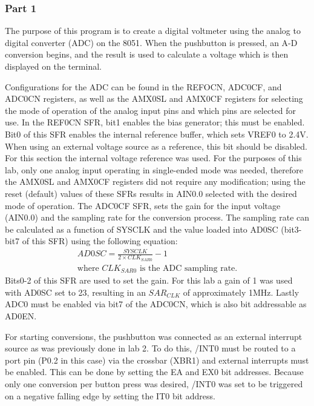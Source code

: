 \documentclass[12pt]{article}
\begin{document}
\subsubsection{Part 1}

The purpose of this program is to create a digital voltmeter using the analog to digital converter (ADC) on the 8051. When the pushbutton is pressed, an A-D conversion begins, and the result is used to calculate a voltage which is then displayed on the terminal. 

Configurations for the ADC can be found in the REFOCN, ADC0CF, and ADC0CN registers, as well as the AMX0SL and AMX0CF registers for selecting the mode of operation of the analog input pins and which pins are selected for use. In the REF0CN SFR, bit1 enables the bias generator; this must be enabled. Bit0 of this SFR enables the internal reference buffer, which sets VREF0 to 2.4V. When using an external voltage source as a reference, this bit should be disabled. For this section the internal voltage reference was used. For the purposes of this lab, only one analog input operating in single-ended mode was needed, therefore the AMX0SL and AMX0CF registers did not require any modification; using the reset (default) values of these SFRs results in AIN0.0 selected with the desired mode of operation. The ADC0CF SFR, sets the gain for the input voltage (AIN0.0) and the sampling rate for the conversion process. The sampling rate can be calculated as a function of SYSCLK and the value loaded into AD0SC (bit3-bit7 of this SFR) using the following equation:
\begin{gather*}
AD0SC = \frac{SYSCLK}{2\times CLK_{SAR0}}-1\\\text{where $CLK_{SAR0}$ is the ADC sampling rate.}
\end{gather*}
\noindent
Bits0-2 of this SFR are used to set the gain. For this lab a gain of 1 was used with AD0SC set to 23, resulting in an $SAR_{CLK}$ of approximately \si{1}{MHz}. Lastly ADC0 must be enabled via bit7 of the ADC0CN, which is also bit addressable as AD0EN.

For starting conversions, the pushbutton was connected as an external interrupt source as was previously done in lab 2. To do this, /INT0 must be routed to a port pin (P0.2 in this case) via the crossbar (XBR1) and external interrupts must be enabled. This can be done by setting the EA and EX0 bit addresses. Because only one conversion per button press was desired, /INT0 was set to be triggered on a negative falling edge by setting the IT0 bit address.
\end{document}
